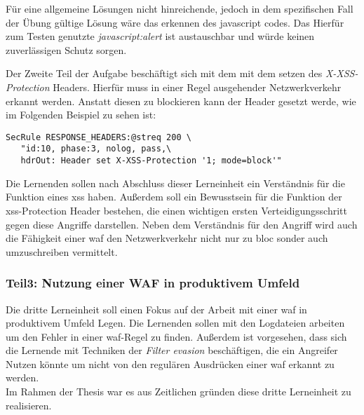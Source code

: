 Für eine allgemeine Lösungen nicht hinreichende, jedoch in dem spezifischen Fall der Übung gültige Lösung wäre das erkennen des javascript codes.
Das Hierfür zum Testen genutzte \textit{javascript:alert} ist austauschbar und würde keinen zuverlässigen Schutz sorgen.

Der Zweite Teil der Aufgabe beschäftigt sich mit dem mit dem setzen des \textit{X-XSS-Protection} Headers.
Hierfür muss in einer Regel ausgehender Netzwerkverkehr erkannt werden.
Anstatt diesen zu blockieren kann der Header gesetzt werde, wie im Folgenden Beispiel zu sehen ist:

\begin{verbatim}
SecRule RESPONSE_HEADERS:@streq 200 \
   "id:10, phase:3, nolog, pass,\
   hdrOut: Header set X-XSS-Protection '1; mode=block'"
\end{verbatim}

Die Lernenden sollen nach Abschluss dieser Lerneinheit ein Verständnis für die Funktion eines \ac{xss} haben.
Außerdem soll ein Bewusstsein für die Funktion der \ac{xss}-Protection Header bestehen, die einen wichtigen ersten Verteidigungsschritt gegen diese Angriffe darstellen.
Neben dem Verständnis für den Angriff wird auch die Fähigkeit einer \ac{waf} den Netzwerkverkehr nicht nur zu bloc sonder auch umzuschreiben vermittelt.

\subsubsection{Teil3: Nutzung einer WAF in produktivem Umfeld}
\label{sec:learning-unit-3-meta}

Die dritte Lerneinheit soll einen Fokus auf der Arbeit mit einer \ac{waf} in produktivem Umfeld Legen.
Die Lernenden sollen mit den Logdateien arbeiten um den Fehler in einer \ac{waf}-Regel zu finden.
Außerdem ist vorgesehen, dass sich die Lernende mit Techniken der \textit{Filter evasion} beschäftigen, die ein Angreifer Nutzen könnte um nicht von den regulären Ausdrücken einer \ac{waf} erkannt zu werden.\\

Im Rahmen der Thesis war es aus Zeitlichen gründen diese dritte Lerneinheit zu realisieren.
